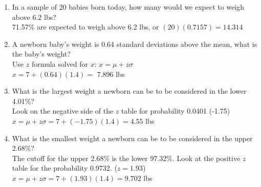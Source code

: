 \documentclass[a4paper]{article}
\begin{document}
\begin{shaded}
\begin{enumerate}
\begin{center}
        \end{center}
        \item In a sample of 20 babies born today, how many would we expect to weigh above 6.2 lbs?
        \vspace{1mm}\\
        71.57\% are expected to weigh above 6.2 lbs, or $(20)(0.7157) = 14.314$
        \item A newborn baby's weight is 0.64 standard deviations above the mean, what is the baby's weight?
        \vspace{1mm}\\
        Use $z$ formula solved for $x$: $\displaystyle x = \mu + z\sigma$\\
        $x = 7 + (0.64)(1.4) =$ 7.896 lbs
        \item What is the largest weight a newborn can be to be considered in the lower 4.01\%?
        \vspace{1mm}\\
        Look on the negative side of the $z$ table for probability 0.0401 (-1.75)\\
        $x = \mu + z\sigma = 7 + (-1.75)(1.4) = 4.55$ lbs
        \item What is the smallest weight a newborn can be to be considered in the upper 2.68\%?
        \vspace{1mm}\\
        The cutoff for the upper 2.68\% is the lower 97.32\%. Look at the positive $z$ table for the probability 0.9732. ($z = 1.93$)\\
        $x = \mu + z\sigma = 7 + (1.93)(1.4) = 9.702$ lbs
    \end{enumerate}
\end{shaded}
\end{document}
